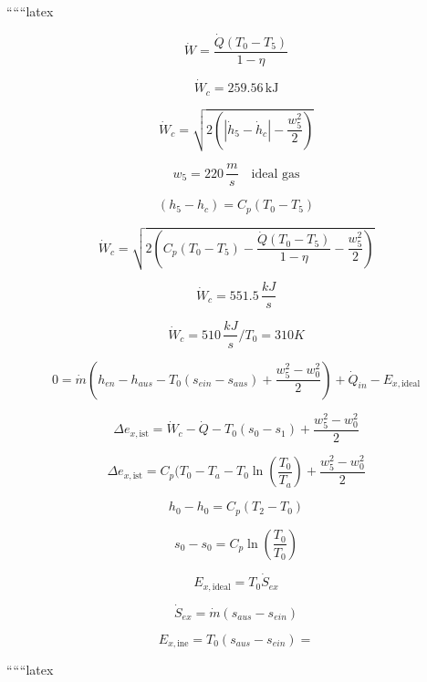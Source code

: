 ``````latex

\[
\dot{W} = \frac{\dot{Q} (T_0 - T_5)}{1 - \eta}
\]

\[
\dot{W}_c = 259.56 \, \text{kJ}
\]

\[
\dot{W}_c = \sqrt{2 \left( \left| \dot{h}_5 - \dot{h}_c \right| - \frac{w_{5}^2}{2} \right)}
\]

\[
w_{5} = 220 \, \frac{m}{s} \quad \text{ideal gas}
\]

\[
(h_5 - h_c) = C_p (T_0 - T_5)
\]

\[
\dot{W}_c = \sqrt{2 \left( C_p (T_0 - T_5) - \frac{\dot{Q} (T_0 - T_5)}{1 - \eta} - \frac{w_{5}^2}{2} \right)}
\]

\[
\dot{W}_c = 551.5 \, \frac{kJ}{s}
\]

\[
\dot{W}_c = 510 \, \frac{kJ}{s} / T_0 = 310 K
\]

\[
0 = \dot{m} \left( h_{en} - h_{aus} - T_0 (s_{ein} - s_{aus}) + \frac{w_{5}^2 - w_{0}^2}{2} \right) + \dot{Q}_{in} - E_{x, \text{ideal}}
\]

\[
\Delta e_{x, \text{ist}} = \dot{W}_c - \dot{Q} - T_0 (s_0 - s_1) + \frac{w_{5}^2 - w_{0}^2}{2}
\]

\[
\Delta e_{x, \text{ist}} = C_p (T_0 - T_a - T_0 \ln \left( \frac{T_0}{T_a} \right) + \frac{w_{5}^2 - w_{0}^2}{2}
\]

\[
h_0 - h_0 = C_p (T_2 - T_0)
\]

\[
s_0 - s_0 = C_p \ln \left( \frac{T_0}{T_0} \right)
\]

\[
E_{x, \text{ideal}} = T_0 \dot{S}_{ex}
\]

\[
\dot{S}_{ex} = \dot{m} (s_{aus} - s_{ein})
\]

\[
E_{x, \text{ine}} = T_0 (s_{aus} - s_{ein}) =
\]

``````latex


